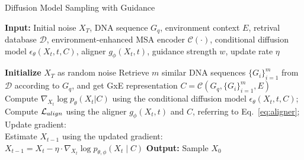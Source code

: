 \begin{algorithm}
\caption{Diffusion Model Sampling with Guidance}
\label{alg:sample}
\begin{algorithmic}[1]
\STATE \textbf{Input:} Initial noise $X_T$, DNA sequence $G_q$, environment context $E$,  retrival database $\mathcal{D}$, environment-enhanced MSA encoder $\mathcal{C}(\cdot)$, conditional diffusion model $\epsilon_{\theta}(X_t, t, C)$, aligner $g_{\phi}(X_t, t)$, guidance strength $w$, update rate $\eta$

\STATE \textbf{Initialize} $X_T$ as random noise
\STATE Retrieve $m$ similar DNA sequences $\{G_i\}_{i=1}^m$ from $\mathcal{D}$ according to $G_q$, and get GxE representation $C= \mathcal{C}(G_q, \{G_i\}_{i=1}^m, E)$
    \STATE Compute $\nabla_{X_t} \log p_{\theta}(X_t| C)$ using the conditional diffusion model $\epsilon_{\theta}(X_t, t, C)$;  
    \STATE Compute ${\mathcal{L}}_{align}$ using the aligner $g_{\phi}(X_t, t)$ and $C$, referring to Eq.~\ref{eq:aligner};
    \STATE Update gradient:\\
    \STATE Estimate $X_{t-1}$ using the updated gradient:\\
    $
    X_{t-1} = X_{t} - \eta \cdot \nabla_{X_{t}} \log p_{\theta, \phi}(X_{t} \mid C)
    $
    \ENDFOR
\STATE \textbf{Output:} Sample $X_0$
\end{algorithmic}
\end{algorithm}

